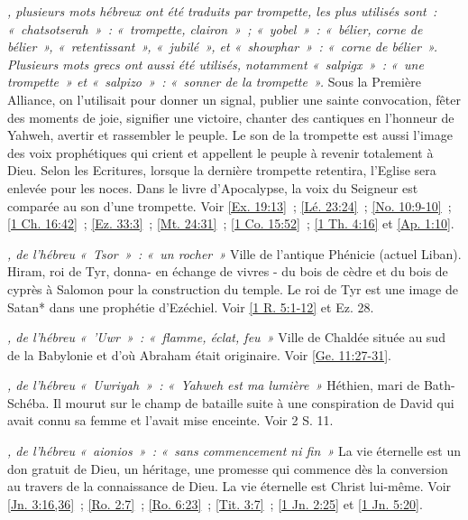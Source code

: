 \begin{multicols}{2}
\textit{, plusieurs mots hébreux ont été traduits par trompette, les plus utilisés sont~: «~chatsotserah~»~: «~trompette, clairon~»~; «~yobel~»~: «~bélier, corne de bélier~», «~retentissant~», «~jubilé~», et «~showphar~»~: «~corne de bélier~». Plusieurs mots grecs ont aussi été utilisés, notamment «~salpigx~»~: «~une trompette~» et «~salpizo~»~: «~sonner de la trompette~».}\newline
Sous la Première Alliance, on l'utilisait pour donner un signal, publier une sainte convocation, fêter des moments de joie, signifier une victoire, chanter des cantiques en l'honneur de Yahweh, avertir et rassembler le peuple. Le son de la trompette est aussi l'image des voix prophétiques qui crient et appellent le peuple à revenir totalement à Dieu. Selon les Ecritures, lorsque la dernière trompette retentira, l'Eglise sera enlevée pour les noces. Dans le livre d'Apocalypse, la voix du Seigneur est comparée au son d'une trompette. Voir \vref{Ex. 19:13}~; \vref{Lé. 23:24}~; \vref{No. 10:9-10}~; \vref{1 Ch. 16:42}~; \vref{Ez. 33:3}~; \vref{Mt. 24:31}~; \vref{1 Co. 15:52}~; \vref{1 Th. 4:16} et \vref{Ap. 1:10}.

\textit{, de l'hébreu «~Tsor~»~: «~un rocher~»}\newline
Ville de l'antique Phénicie (actuel Liban). Hiram, roi de Tyr, donna- en échange de vivres - du bois de cèdre et du bois de cyprès à Salomon pour la construction du temple. Le roi de Tyr est une image de Satan* dans une prophétie d'Ezéchiel. Voir \vref{1 R. 5:1-12} et Ez. 28.

\textit{, de l'hébreu «~'Uwr~»~: «~flamme, éclat, feu~»}\newline
Ville de Chaldée située au sud de la Babylonie et d'où Abraham était originaire. Voir \vref{Ge. 11:27-31}.

\textit{, de l'hébreu «~Uwriyah~»~: «~Yahweh est ma lumière~»}\newline
Héthien, mari de Bath-Schéba. Il mourut sur le champ de bataille suite à une conspiration de David qui avait connu sa femme et l'avait mise enceinte. Voir 2 S. 11.

\textit{, de l'hébreu «~aionios~»~: «~sans commencement ni fin~»}\newline
La vie éternelle est un don gratuit de Dieu, un héritage, une promesse qui commence dès la conversion au travers de la connaissance de Dieu. La vie éternelle est Christ lui-même. Voir \vref{Jn. 3:16,36}~; \vref{Ro. 2:7}~; \vref{Ro. 6:23}~; \vref{Tit. 3:7}~; \vref{1 Jn. 2:25} et \vref{1 Jn. 5:20}.


\end{multicols}
